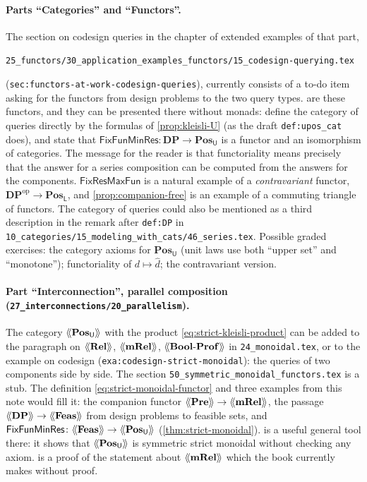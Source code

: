 \documentclass[11pt,a4paper]{article}
\theoremstyle{plain}
\theoremstyle{definition}
\theoremstyle{remark}
\newcommand{\Cat}[1]{\mathbf{#1}}
\newcommand{\Rel}{\Cat{Rel}}
\newcommand{\Pre}{\Cat{Pre}}
\newcommand{\mRel}{\Cat{mRel}}
\newcommand{\Feas}{\Cat{Feas}}
\newcommand{\DP}{\Cat{DP}}
\newcommand{\BoolProf}{\Cat{Bool}\text{-}\Cat{Prof}}
\newcommand{\U}{\mathsf{U}}
\newcommand{\Lo}{\mathsf{L}}
\providecommand{\llangle}{\mathopen{\langle\mkern-3.5mu\langle}}
\providecommand{\rrangle}{\mathclose{\rangle\mkern-3.5mu\rangle}}
\newcommand{\tL}[1]{\llangle #1 \rrangle}
\newcommand{\op}{^{\mathrm{op}}}
\newcommand{\Fix}{\mathsf{FixFunMinRes}}
\newcommand{\FixR}{\mathsf{FixResMaxFun}}
\newcommand{\lbl}[1]{\nolinkurl{#1}}
\newcommand{\file}[1]{\nolinkurl{#1}}
\begin{document}
\paragraph{Parts ``Categories'' and ``Functors''.}
The section on codesign queries in the chapter of extended examples of that part,
\begin{center}
    \file{25_functors/30_application_examples_functors/15_codesign-querying.tex}
\end{center}
(\lbl{sec:functors-at-work-codesign-queries}), currently consists of a to-do item asking for the functors from design problems to the two query types.
 are these functors, and they can be presented there without monads: define the category of queries directly by the formulas of \cref{prop:kleisli-U} (as the draft \lbl{def:upos_cat} does), and state that $\Fix \colon \DP \to \Cat{Pos}_{\U}$ is a functor and an isomorphism of categories.
The message for the reader is that functoriality means precisely that the answer for a series composition can be computed from the answers for the components.
$\FixR$ is a natural example of a \emph{contravariant} functor, $\DP\op \to \Cat{Pos}_{\Lo}$, and \cref{prop:companion-free} is an example of a commuting triangle of functors.
The category of queries could also be mentioned as a third description in the remark after \lbl{def:DP} in \file{10_categories/15_modeling_with_cats/46_series.tex}.
Possible graded exercises: the category axioms for $\Cat{Pos}_{\U}$ (unit laws use both ``upper set'' and ``monotone''); functoriality of $d \mapsto \widehat{d}$; the contravariant version.

\paragraph{Part ``Interconnection'', parallel composition (\file{27_interconnections/20_parallelism}).}
The category $\tL{\Cat{Pos}_{\U}}$ with the product \cref{eq:strict-kleisli-product} can be added to the paragraph on $\tL{\Rel}$, $\tL{\mRel}$, $\tL{\BoolProf}$ in \file{24_monoidal.tex}, or to the example on codesign (\lbl{exa:codesign-strict-monoidal}): the queries of two components side by side.
The section \file{50_symmetric_monoidal_functors.tex} is a stub.
The definition \cref{eq:strict-monoidal-functor} and three examples from this note would fill it: the companion functor $\tL{\Pre} \to \tL{\mRel}$, the passage $\tL{\DP} \to \tL{\Feas}$ from design problems to feasible sets, and $\Fix \colon \tL{\Feas} \to \tL{\Cat{Pos}_{\U}}$ (\cref{thm:strict-monoidal}).
 is a useful general tool there: it shows that $\tL{\Cat{Pos}_{\U}}$ is symmetric strict monoidal without checking any axiom.
 is a proof of the statement about $\tL{\mRel}$ which the book currently makes without proof.
\end{document}
